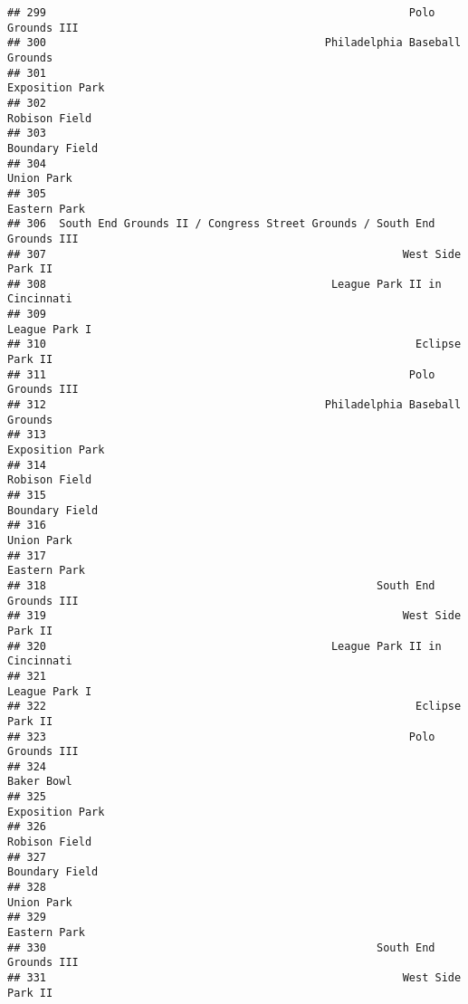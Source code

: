 \documentclass[]{article}
\begin{document}
\begin{verbatim}
## 299                                                        Polo Grounds III
## 300                                           Philadelphia Baseball Grounds
## 301                                                         Exposition Park
## 302                                                           Robison Field
## 303                                                          Boundary Field
## 304                                                              Union Park
## 305                                                            Eastern Park
## 306  South End Grounds II / Congress Street Grounds / South End Grounds III
## 307                                                       West Side Park II
## 308                                            League Park II in Cincinnati
## 309                                                           League Park I
## 310                                                         Eclipse Park II
## 311                                                        Polo Grounds III
## 312                                           Philadelphia Baseball Grounds
## 313                                                         Exposition Park
## 314                                                           Robison Field
## 315                                                          Boundary Field
## 316                                                              Union Park
## 317                                                            Eastern Park
## 318                                                   South End Grounds III
## 319                                                       West Side Park II
## 320                                            League Park II in Cincinnati
## 321                                                           League Park I
## 322                                                         Eclipse Park II
## 323                                                        Polo Grounds III
## 324                                                              Baker Bowl
## 325                                                         Exposition Park
## 326                                                           Robison Field
## 327                                                          Boundary Field
## 328                                                              Union Park
## 329                                                            Eastern Park
## 330                                                   South End Grounds III
## 331                                                       West Side Park II

\end{verbatim}
\end{document}
